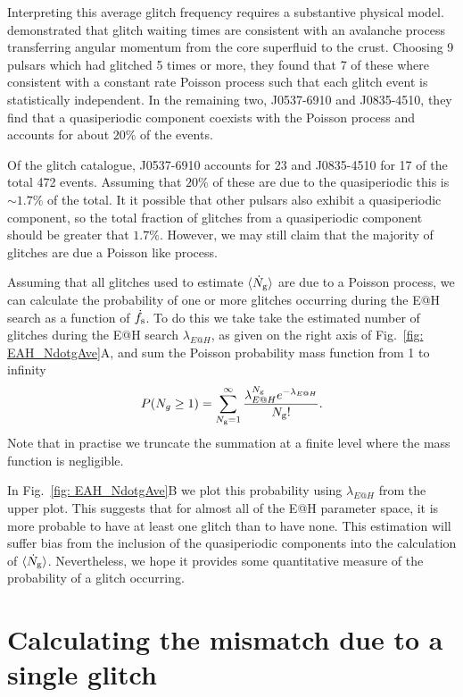 \documentclass[../full_thesis/full_thesis.tex]{subfiles}
\begin{document}
Interpreting this average glitch frequency requires a substantive physical
model. \citet{Melatos2008} demonstrated that glitch waiting times are consistent
with an avalanche process transferring angular momentum from the core superfluid
to the crust. Choosing 9 pulsars which had glitched 5 times or more, they found
that 7 of these where consistent with a constant rate Poisson process such that
each glitch event is statistically independent. In the remaining two, J0537-6910
and J0835-4510, they find that a quasiperiodic component coexists with the Poisson
process and accounts for about $20\%$ of the events.

Of the glitch catalogue, J0537-6910 accounts for 23 and J0835-4510 for 17 of
the total 472 events. Assuming that $20\%$ of these are due to the quasiperiodic
this is $\sim 1.7\%$ of the total. It it possible that other pulsars also exhibit
a quasiperiodic component, so the total fraction of glitches from a quasiperiodic
component should be greater that $1.7\%$. However, we may still claim that the
majority of glitches are due a Poisson like process.

Assuming that all glitches used to estimate $\langle \dot{N}_{\textrm{g}}\rangle$ are due to a Poisson
process, we can calculate the probability of one or more glitches occurring during
the E@H search as a function of $\dot{f}_{\textrm{s}}$. To do this we take take the
estimated number of glitches during the E@H search
$\lambda_{E@H}$, as given on the right axis of Fig.~\ref{fig: EAH_NdotgAve}A,
and sum the Poisson probability mass function from 1 to infinity
\begin{align}
P(N_{g} \ge 1) = \sum_{N_{\textrm{g}}=1}^{\infty}\frac{\lambda_{E@H}^{N_{\textrm{g}}}e^{-\lambda_{E@H}}}{N_{\textrm{g}}!}.
\end{align}
Note that in practise we truncate the summation at a finite level where the
mass function is negligible.

In Fig.~\ref{fig: EAH_NdotgAve}B we plot this probability
using $\lambda_{E@H}$ from the upper plot. This suggests that for almost all of
the E@H parameter space, it is more probable to have at least one glitch than
to have none. This estimation will suffer bias from the inclusion of the
quasiperiodic components into the calculation of $\langle \dot{N}_{\textrm{g}}\rangle$. Nevertheless, we
hope it provides some quantitative measure of the probability of a glitch occurring.

\section{Calculating the mismatch due to a single glitch}
\label{sec: mismatch due to glitches}
\end{document}
